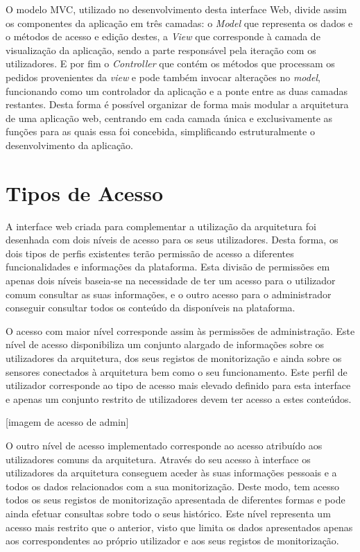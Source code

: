 O modelo MVC, utilizado no desenvolvimento desta interface Web, divide assim os componentes da aplicação em três camadas: o \textit{Model} que representa os dados e o métodos de acesso e edição destes, a \textit{View} que corresponde à camada de visualização da aplicação, sendo a parte responsável pela iteração com os utilizadores. E por fim o \textit{Controller} que contém os métodos que processam os pedidos provenientes da \textit{view} e pode também invocar alterações no \textit{model}, funcionando como um controlador da aplicação e a ponte entre as duas camadas restantes. Desta forma é possível organizar de forma mais modular a arquitetura de uma aplicação web, centrando em cada camada única e exclusivamente as funções para as quais essa foi concebida, simplificando estruturalmente o desenvolvimento da aplicação.

\section{Tipos de Acesso}

A interface web criada para complementar a utilização da arquitetura foi desenhada com dois níveis de acesso para os seus utilizadores. Desta forma, os dois tipos de perfis existentes terão permissão de acesso a diferentes funcionalidades e informações da plataforma. Esta divisão de permissões em apenas dois níveis baseia-se na necessidade de ter um acesso para o utilizador comum consultar as suas informações, e o outro acesso para o administrador conseguir consultar todos os conteúdo da disponíveis na plataforma.

O acesso com maior nível corresponde assim às permissões de administração. Este nível de acesso disponibiliza um conjunto alargado de informações sobre os utilizadores da arquitetura, dos seus registos de monitorização e ainda sobre os sensores conectados à arquitetura bem como o seu funcionamento. Este perfil de utilizador corresponde ao tipo de acesso mais elevado definido para esta interface e apenas um conjunto restrito de utilizadores devem ter acesso a estes conteúdos.

[imagem de acesso de admin]

O outro nível de acesso implementado corresponde ao acesso atribuído aos utilizadores comuns da arquitetura. Através do seu acesso à interface os utilizadores da arquitetura conseguem aceder às suas informações pessoais e a todos os dados relacionados com a sua monitorização. Deste modo, tem acesso todos os seus registos de monitorização apresentada de diferentes formas e pode ainda efetuar consultas sobre todo o seus histórico. Este nível representa um acesso mais restrito que o anterior, visto que limita os dados apresentados apenas aos correspondentes ao próprio utilizador e aos seus registos de monitorização.

